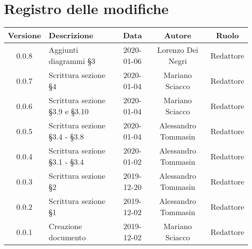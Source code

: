 \section*{Registro delle modifiche}

\begin{center}
	\begin{longtable}{|c|p{5cm}|c|c|c|}
	\hline
	\rowcolor{lighter-grayer}
	\textbf{Versione} & \textbf{Descrizione} & \textbf{Data} & \textbf{Autore} & \textbf{Ruolo} \\
	\hline
	\endfirsthead


	0.0.8 & Aggiunti diagrammi \S3 & 2020-01-06 & Lorenzo Dei Negri & Redattore \\
	\hline
	0.0.7 & Scrittura sezione \S4 & 2020-01-04 & Mariano Sciacco & Redattore \\
	\hline
	0.0.6 & Scrittura sezione \S3.9 e \S3.10 & 2020-01-04 & Mariano Sciacco & Redattore \\
	\hline
	0.0.5 & Scrittura sezione \S3.4 - \S3.8 & 2020-01-04 & Alessandro Tommasin & Redattore \\
	\hline
	0.0.4 & Scrittura sezione \S3.1 - \S3.4 & 2020-01-02 & Alessandro Tommasin & Redattore \\
	\hline
	0.0.3 & Scrittura sezione \S2 & 2019-12-20 & Alessandro Tommasin & Redattore \\
	\hline
	0.0.2 & Scrittura sezione \S1 & 2019-12-02 & Alessandro Tommasin & Redattore \\
	\hline
	0.0.1 & Creazione documento & 2019-12-02 & Mariano Sciacco & Redattore \\
	\hline

	\end{longtable}
\end{center}